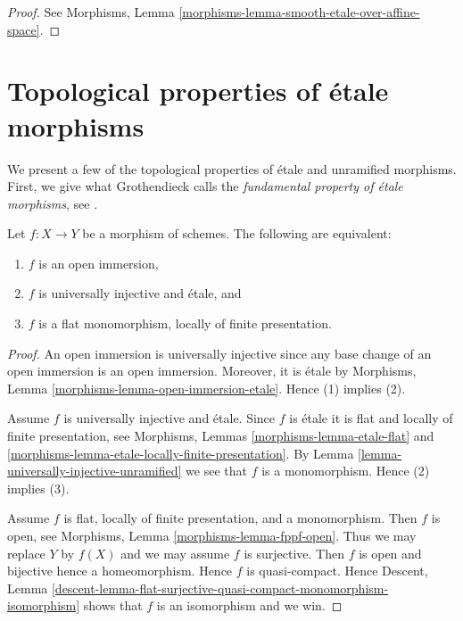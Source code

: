 \begin{proof}
See
Morphisms, Lemma \ref{morphisms-lemma-smooth-etale-over-affine-space}.
\end{proof}




\section{Topological properties of \'etale morphisms}
\label{section-topological-etale}

\noindent
We present a few of the topological properties of \'etale and
unramified morphisms. First, we give what Grothendieck
calls the {\it fundamental property of \'etale morphisms}, see
\cite[Expos\'e I.5]{SGA1}.

\begin{theorem}
\label{theorem-etale-radicial-open}
Let $f : X \to Y$ be a morphism of schemes.
The following are equivalent:
\begin{enumerate}
\item $f$ is an open immersion,
\item $f$ is universally injective and \'etale, and
\item $f$ is a flat monomorphism, locally of finite presentation.
\end{enumerate}
\end{theorem}

\begin{proof}
An open immersion is universally injective
since any base change of an open immersion
is an open immersion. Moreover, it is \'etale by
Morphisms, Lemma \ref{morphisms-lemma-open-immersion-etale}.
Hence (1) implies (2).

\medskip\noindent
Assume $f$ is universally injective and \'etale.
Since $f$ is \'etale it is flat and locally of finite presentation, see
Morphisms, Lemmas \ref{morphisms-lemma-etale-flat} and
\ref{morphisms-lemma-etale-locally-finite-presentation}.
By
Lemma \ref{lemma-universally-injective-unramified}
we see that $f$ is a monomorphism. Hence (2) implies (3).

\medskip\noindent
Assume $f$ is flat, locally of finite presentation, and a monomorphism.
Then $f$ is open, see
Morphisms, Lemma \ref{morphisms-lemma-fppf-open}.
Thus we may replace $Y$ by $f(X)$ and we may assume $f$ is
surjective. Then $f$ is open and bijective hence a homeomorphism.
Hence $f$ is quasi-compact. Hence
Descent, Lemma
\ref{descent-lemma-flat-surjective-quasi-compact-monomorphism-isomorphism}
shows that $f$ is an isomorphism and we win.
\end{proof}

